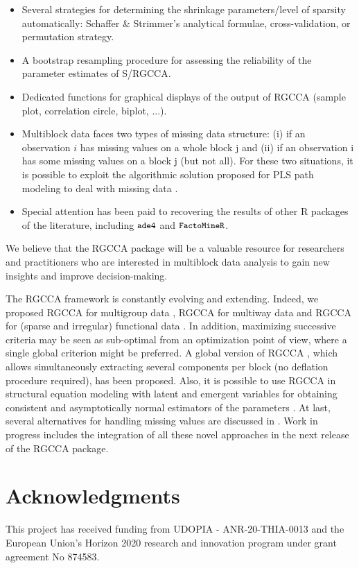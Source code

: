 \documentclass[
]{jss}
\begin{document}
\begin{itemize}
\item Several strategies for determining the shrinkage 
parameters/level of sparsity automatically: Schaffer \& Strimmer's analytical formulae,  
cross-validation, or permutation strategy.

\item A bootstrap resampling procedure for assessing the reliability of the 
parameter estimates of S/RGCCA.

\item Dedicated functions for graphical displays of the output of RGCCA 
(sample plot, correlation circle, biplot, ...).

\item Multiblock data faces two types of missing data structure: (i) if an 
observation $i$ has missing values on a whole block j and (ii) if an 
observation i has some missing values on a block j (but not all). For these two 
situations, it is possible to exploit the algorithmic solution proposed for PLS 
path modeling to deal with missing data \citep[see][]{Tenenhaus2005}.

\item Special attention has been paid to recovering the results of other R packages 
of the literature, including $\small{\texttt{ade4}}$ and 
$\small{\texttt{FactoMineR}}$.
\end{itemize}

We believe that the RGCCA package will be a valuable resource for
researchers and practitioners who are interested in multiblock data
analysis to gain new insights and improve decision-making.

The RGCCA framework is constantly evolving and extending. Indeed, we
proposed RGCCA for multigroup data \citep{Tenenhaus2014b}, RGCCA for
multiway data \citep{Gloaguen2020, Girka2023} and RGCCA for (sparse and
irregular) functional data \citep{Sort2023}. In addition, maximizing
successive criteria may be seen as sub-optimal from an optimization
point of view, where a single global criterion might be preferred. A
global version of RGCCA \citep{Gloaguen2020b}, which allows
simultaneously extracting several components per block (no deflation
procedure required), has been proposed. Also, it is possible to use
RGCCA in structural equation modeling with latent and emergent variables
for obtaining consistent and asymptotically normal estimators of the
parameters \citep{Tenenhaus2023}. At last, several alternatives for
handling missing values are discussed in \cite{Peltier2022}. Work in
progress includes the integration of all these novel approaches in the
next release of the RGCCA package.

\hypertarget{acknowledgments}{%
\section*{Acknowledgments}\label{acknowledgments}}

This project has received funding from UDOPIA - ANR-20-THIA-0013 and the
European Union's Horizon 2020 research and innovation program under
grant agreement No 874583.

\renewcommand\refname{References}

\end{document}
